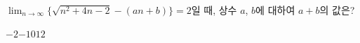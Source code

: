 $\displaystyle\lim_{n\to\infty}\{\sqrt{n^2+4n-2}-(an+b)\}=2$일 때, 상수 $a$, $b$에 대하여 $a+b$의 값은?
\begin{choices32}{$-2$}{$-1$}{$0$}{$1$}{$2$}\end{choices32}
